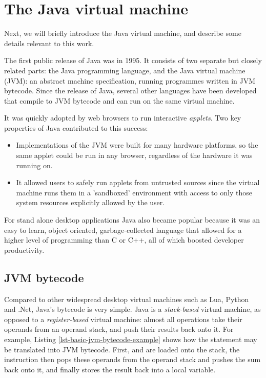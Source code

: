 \section{The Java virtual machine}
Next, we will briefly introduce the Java virtual machine, and describe some details relevant to this work.

The first public release of Java was in 1995. It consists of two separate but closely related parts: the Java programming language, and the Java virtual machine (JVM): an abstract machine specification, running programmes written in JVM bytecode. Since the release of Java, several other languages have been developed that compile to JVM bytecode and can run on the same virtual machine.

It was quickly adopted by web browsers to run interactive \emph{applets}. Two key properties of Java contributed to this success:
\begin{itemize}
    \item Implementations of the JVM were built for many hardware platforms, so the same applet could be run in any browser, regardless of the hardware it was running on.
    \item It allowed users to safely run applets from untrusted sources since the virtual machine runs them in a 'sandboxed' environment with access to only those system resources explicitly allowed by the user.
\end{itemize}

For stand alone desktop applications Java also became popular because it was an easy to learn, object oriented, garbage-collected language that allowed for a higher level of programming than C or C++, all of which boosted developer productivity.

\subsection{JVM bytecode}
Compared to other widespread desktop virtual machines such as Lua, Python and .Net, Java's bytecode is very simple. Java is a \emph{stack-based} virtual machine, as opposed to a \emph{register-based} virtual machine: almost all operations take their operands from an operand stack, and push their results back onto it. For example, Listing \ref{lst-basic-jvm-bytecode-example} shows how the statement  may be translated into JVM bytecode. First,  and  are loaded onto the stack, the  instruction then pops these operands from the operand stack and pushes the sum back onto it, and finally  stores the result back into a local variable.

